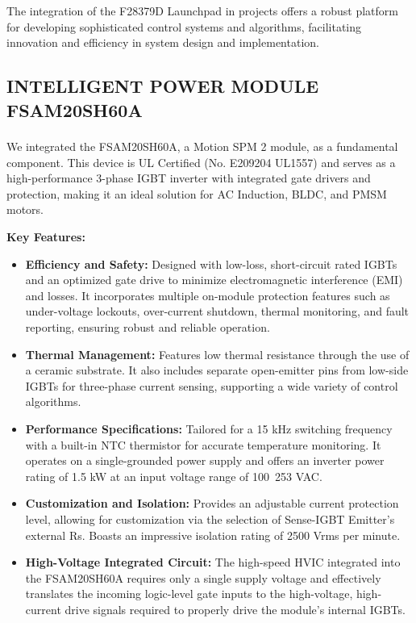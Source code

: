 The integration of the F28379D Launchpad in projects offers a robust platform for developing sophisticated control systems and algorithms, facilitating innovation and efficiency in system design and implementation.



\subsection{INTELLIGENT POWER MODULE FSAM20SH60A}


We integrated the FSAM20SH60A, a Motion SPM\textsuperscript{\textregistered} 2 module, as a fundamental component. This device is UL Certified (No. E209204 UL1557) and serves as a high-performance 3-phase IGBT inverter with integrated gate drivers and protection, making it an ideal solution for AC Induction, BLDC, and PMSM motors.

\textbf{Key Features:}
\begin{itemize}
    \item \textbf{Efficiency and Safety:} Designed with low-loss, short-circuit rated IGBTs and an optimized gate drive to minimize electromagnetic interference (EMI) and losses. It incorporates multiple on-module protection features such as under-voltage lockouts, over-current shutdown, thermal monitoring, and fault reporting, ensuring robust and reliable operation.
    \item \textbf{Thermal Management:} Features low thermal resistance through the use of a ceramic substrate. It also includes separate open-emitter pins from low-side IGBTs for three-phase current sensing, supporting a wide variety of control algorithms.
    \item \textbf{Performance Specifications:} Tailored for a 15 kHz switching frequency with a built-in NTC thermistor for accurate temperature monitoring. It operates on a single-grounded power supply and offers an inverter power rating of 1.5 kW at an input voltage range of 100~253 VAC.
    \item \textbf{Customization and Isolation:} Provides an adjustable current protection level, allowing for customization via the selection of Sense-IGBT Emitter's external Rs. Boasts an impressive isolation rating of 2500 Vrms per minute.
    \item \textbf{High-Voltage Integrated Circuit:} The high-speed HVIC integrated into the FSAM20SH60A requires only a single supply voltage and effectively translates the incoming logic-level gate inputs to the high-voltage, high-current drive signals required to properly drive the module's internal IGBTs.
\end{itemize}

